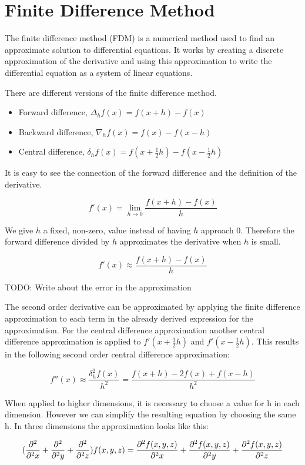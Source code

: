 \section{Finite Difference Method}

The finite difference method (FDM) is a numerical method used to find an approximate 
solution to differential equations. It works by creating a discrete approximation 
of the derivative and using this approximation to write the differential equation 
as a system of linear equations.

There are different versions of the finite difference method.
\begin{itemize}
	\item Forward difference, $\Delta_hf(x) = f(x+h) - f(x)$
	\item Backward difference, $\nabla_hf(x) = f(x) - f(x - h)$
	\item Central difference, $\delta_hf(x) = f(x + \frac{1}{2}h) - f(x - \frac{1}{2}h)$
\end{itemize}

It is easy to see the connection of the forward difference and the definition of 
the derivative.

$$f'(x) = \lim_{h \to 0} \frac{f(x+h) - f(x)}{h}$$

We give $h$ a fixed, non-zero, value instead of having $h$ approach 0. Therefore 
the forward difference divided by $h$ approximates the derivative when $h$ is small.

$$f'(x) \approx \frac{f(x+h) - f(x)}{h}$$

TODO: Write about the error in the approximation

The second order derivative can be approximated by applying the finite difference 
approximation to each term in the already derived expression for the approximation. 
For the central difference approximation another central difference approximation 
is applied to $f'(x + \frac{1}{2}h)$ and $f'(x - \frac{1}{2}h)$. This results in 
the following second order central difference approximation:

$$f''(x) \approx \frac{\delta_h^2f(x)}{h^2} = \frac{f(x+h) - 2f(x) + f(x-h)}{h^2}$$

When applied to higher dimensions, it is necessary to choose a value for h in 
each dimension. However we can simplify the resulting equation by choosing the same h. 
In three dimensions the approximation looks like this:

$$(\frac{\partial^2}{\partial^2 x} + \frac{\partial^2}{\partial^2 y} + \frac{\partial^2}{\partial^2 z}) f (x, y, z) = \frac{\partial^2 f(x, y, z)}{\partial^2 x} 
+ \frac{\partial^2 f(x, y, z)}{\partial^2 y} + \frac{\partial^2 f(x, y, z)}{\partial^2 z}$$

